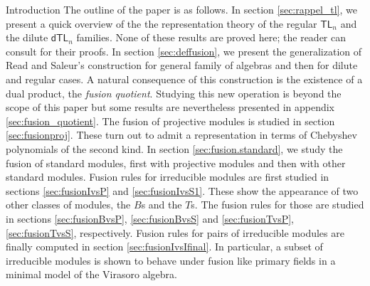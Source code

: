 \documentclass[reqno]{amsart}
\newcommand{\dtl}[1]{\mathsf{dTL}_{#1}}
\newcommand{\tl}[1]{\mathsf{TL}_{#1}}
\begin{document}
\begin{section}{Introduction}
The outline of the paper is as follows. In section \ref{sec:rappel_tl}, we present a quick overview of the the representation theory of the regular $\tl{n}$ and the dilute $\dtl{n}$ families. None of these results are proved here; the reader can consult \cite{RiSY,BelSY,BelRiSy} for their proofs. In section \ref{sec:deffusion}, we present the generalization of Read and Saleur's construction for general family of algebras and then for dilute and regular cases. A natural consequence of this construction is the existence of a dual product, the \emph{fusion quotient}. Studying this new operation is beyond the scope of this paper but some results are nevertheless presented in appendix \ref{sec:fusion_quotient}. The fusion of projective modules is studied in section \ref{sec:fusionproj}. These turn out to admit a representation in terms of Chebyshev polynomials of the second kind. In section \ref{sec:fusion.standard}, we study the fusion of standard modules, first with projective modules and then with other standard modules. Fusion rules for irreducible modules are first studied in sections \ref{sec:fusionIvsP} and \ref{sec:fusionIvsS1}. These show the appearance of two other classes of modules, the $B$s and the $T$s. The fusion rules for those are studied in sections \ref{sec:fusionBvsP}, \ref{sec:fusionBvsS} and \ref{sec:fusionTvsP}, \ref{sec:fusionTvsS}, respectively. Fusion rules for pairs of irreducible modules are finally computed in section \ref{sec:fusionIvsIfinal}. In particular, a subset of irreducible modules is shown to behave under fusion like primary fields in a minimal model of the Virasoro algebra.
\end{section}
\end{document}

